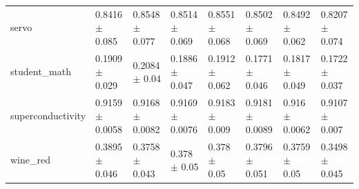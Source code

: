 \begin{tabular}{llllllll}
servo & 0.8416 $\pm$ 0.085 & 0.8548 $\pm$ 0.077 & 0.8514 $\pm$ 0.069 & 0.8551 $\pm$ 0.068 & 0.8502 $\pm$ 0.069 & 0.8492 $\pm$ 0.062 & 0.8207 $\pm$ 0.074 \\
student\_math & 0.1909 $\pm$ 0.029 & 0.2084 $\pm$ 0.04 & 0.1886 $\pm$ 0.047 & 0.1912 $\pm$ 0.062 & 0.1771 $\pm$ 0.046 & 0.1817 $\pm$ 0.049 & 0.1722 $\pm$ 0.037 \\
superconductivity & 0.9159 $\pm$ 0.0058 & 0.9168 $\pm$ 0.0082 & 0.9169 $\pm$ 0.0076 & 0.9183 $\pm$ 0.009 & 0.9181 $\pm$ 0.0089 & 0.916 $\pm$ 0.0062 & 0.9107 $\pm$ 0.007 \\
wine\_red & 0.3895 $\pm$ 0.046 & 0.3758 $\pm$ 0.043 & 0.378 $\pm$ 0.05 & 0.378 $\pm$ 0.05 & 0.3796 $\pm$ 0.051 & 0.3759 $\pm$ 0.05 & 0.3498 $\pm$ 0.045 \\
\bottomrule
\end{tabular}
